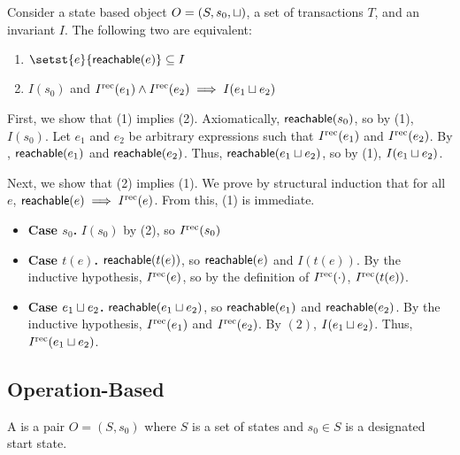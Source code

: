 \begin{claim}
  Consider a state based object $O = (S, s_0, \sqcup)$, a set of transactions
  $T$, and an invariant $I$. The following two are equivalent:
  \begin{enumerate}[\quad(1)]
    \item
      $\setst{e}{\reachable{e}} \subseteq I$

    \item
      $I(s_0)$ and $I^{\text{rec}}(e_1) \land I^{\text{rec}}(e_2) \implies I(e_1 \sqcup e_2)$
  \end{enumerate}
\end{claim}
\begin{elidableproof}
  First, we show that (1) implies (2). Axiomatically, $\textsf{reachable}(s_0)$, so by
  (1), $I(s_0)$. Let $e_1$ and $e_2$ be arbitrary expressions such that
  $I^{\text{rec}}(e_1)$ and $I^{\text{rec}}(e_2)$. By ,
  $\textsf{reachable}(e_1)$ and $\textsf{reachable}(e_2)$. Thus, $\textsf{reachable}(e_1 \sqcup e_2)$,
  so by (1), $I(e_1 \sqcup e_2)$.

  Next, we show that (2) implies (1). We prove by structural induction that for
  all $e$, $\textsf{reachable}(e) \implies I^{\text{rec}}(e)$. From this, (1) is immediate.
  \begin{itemize}
    \item \textbf{Case $s_0$.}
      $I(s_0)$ by (2), so $I^{\text{rec}}(s_0)$

    \item \textbf{Case $t(e)$.}
      $\textsf{reachable}(t(e))$, so $\textsf{reachable}(e)$ and $I(t(e))$. By the inductive
      hypothesis, $I^{\text{rec}}(e)$, so by the definition of $I^{\text{rec}}(\cdot)$,
      $I^{\text{rec}}(t(e))$.

    \item \textbf{Case $e_1 \sqcup e_2$.}
      $\textsf{reachable}(e_1 \sqcup e_2)$, so $\textsf{reachable}(e_1)$ and $\textsf{reachable}(e_2)$.
      By the inductive hypothesis, $I^{\text{rec}}(e_1)$ and $I^{\text{rec}}(e_2)$. By $(2)$,
      $I(e_1 \sqcup e_2)$. Thus, $I^{\text{rec}}(e_1 \sqcup e_2)$.
  \end{itemize}
\end{elidableproof}

\subsection{Operation-Based}
\begin{definition}
  A  is a pair $O = (S, s_0)$ where
  $S$ is a set of states and $s_0 \in S$ is a designated start state.
\end{definition}

